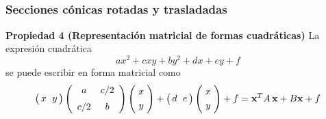 \begin{frame}
\end{frame}


\subsection{}

{\nologo 
\begin{frame}\frametitle{Secciones cónicas rotadas y trasladadas}
		
		\vspace{-1mm}		
		\begin{prop}{\textbf{Propiedad 4 (Representación matricial de formas cuadráticas)}}
			La expresión cuadrática 
			\[
			ax^2+cxy+by^2 + dx + ey + f
			\]
			se puede escribir en forma matricial como
			\[
			\left(
			\begin{array}{@{\hspace{0.3\tabcolsep}}c@{\hspace{\tabcolsep}}c@{\hspace{0.3\tabcolsep}}}
			x & y  
			\end{array}
			\right)
			\left(
			\begin{array}{cc}
			a & c/2   \\[2mm]
			c/2 & b
			\end{array}
			\right)
			\left(
			\begin{array}{@{\hspace{0.5\tabcolsep}}c@{\hspace{0.5\tabcolsep}}}
			x   \\[1mm]
			y
			\end{array}
			\right)
			+
			\left(
			\begin{array}{@{\hspace{0.3\tabcolsep}}c@{\hspace{\tabcolsep}}c@{\hspace{0.3\tabcolsep}}}
			d & e  
			\end{array}
			\right)
			\left(
			\begin{array}{@{\hspace{0.5\tabcolsep}}c@{\hspace{0.5\tabcolsep}}}
			x   \\[1mm]
			y
			\end{array}
			\right)
			+ f
			=
			\mathbf{x}^T A\, \mathbf{x} +
			B\mathbf{x} + f
			\]
		\end{prop}
				

\end{frame}}
